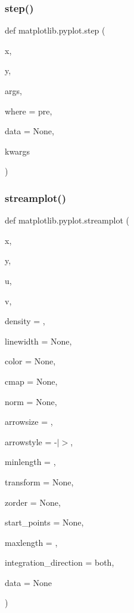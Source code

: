 \subsubsection{\texorpdfstring{step()}{step()}}
{\footnotesize\ttfamily def matplotlib.\+pyplot.\+step (\begin{DoxyParamCaption}\item[{}]{x,  }\item[{}]{y,  }\item[{}]{args,  }\item[{}]{where = {\ttfamily \textquotesingle{}pre\textquotesingle{}},  }\item[{}]{data = {\ttfamily None},  }\item[{}]{kwargs }\end{DoxyParamCaption})}

\mbox{\label{namespacematplotlib_1_1pyplot_a67a95d4f9436353c7236304ff7bb8a94}} 
\subsubsection{\texorpdfstring{streamplot()}{streamplot()}}
{\footnotesize\ttfamily def matplotlib.\+pyplot.\+streamplot (\begin{DoxyParamCaption}\item[{}]{x,  }\item[{}]{y,  }\item[{}]{u,  }\item[{}]{v,  }\item[{}]{density = {},  }\item[{}]{linewidth = {\ttfamily None},  }\item[{}]{color = {\ttfamily None},  }\item[{}]{cmap = {\ttfamily None},  }\item[{}]{norm = {\ttfamily None},  }\item[{}]{arrowsize = {},  }\item[{}]{arrowstyle = {\ttfamily \textquotesingle{}-\/$\vert$$>$\textquotesingle{}},  }\item[{}]{minlength = {},  }\item[{}]{transform = {\ttfamily None},  }\item[{}]{zorder = {\ttfamily None},  }\item[{}]{start\+\_\+points = {\ttfamily None},  }\item[{}]{maxlength = {},  }\item[{}]{integration\+\_\+direction = {\ttfamily \textquotesingle{}both\textquotesingle{}},  }\item[{}]{data = {\ttfamily None} }\end{DoxyParamCaption})}

